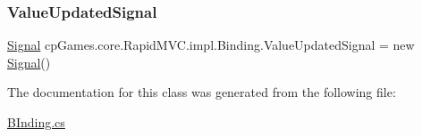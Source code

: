 \subsubsection{\texorpdfstring{ValueUpdatedSignal}{ValueUpdatedSignal}}
{\footnotesize\ttfamily \mbox{\hyperlink{classcp_games_1_1core_1_1_rapid_m_v_c_1_1_signal}{Signal}} cp\+Games.\+core.\+Rapid\+M\+V\+C.\+impl.\+Binding.\+Value\+Updated\+Signal = new \mbox{\hyperlink{classcp_games_1_1core_1_1_rapid_m_v_c_1_1_signal}{Signal}}()\hspace{0.3cm}{\ttfamily [get]}}



The documentation for this class was generated from the following file\+:\begin{DoxyCompactItemize}
\item 
\mbox{\hyperlink{_b_inding_8cs}{B\+Inding.\+cs}}\end{DoxyCompactItemize}
